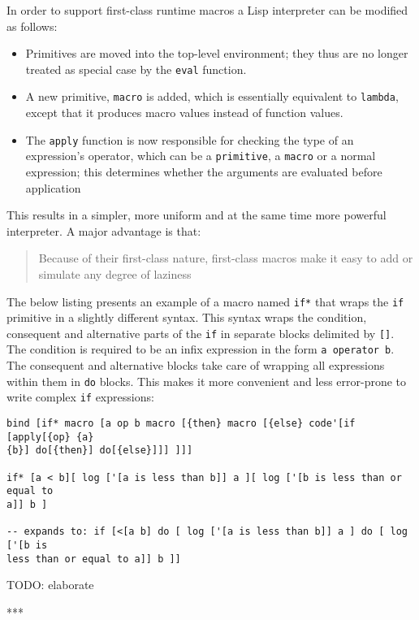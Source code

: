 In order to support first-class runtime macros a Lisp interpreter can be
modified as follows\cite{macros}:
\begin{itemize}
    \item Primitives are moved into the top-level environment; they thus are
    no longer treated as special case by the \texttt{eval} function.
    \item A new primitive, \texttt{macro} is added, which is essentially
    equivalent to \texttt{lambda}, except that it produces macro values
    instead of function values.
    \item The \texttt{apply} function is now responsible for checking the
    type of an expression's operator, which can be a \texttt{primitive}, a
    \texttt{macro} or a normal expression; this determines whether the
    arguments are evaluated before application
\end{itemize}

This results in a simpler, more uniform and at the same time more powerful
interpreter. A major advantage is that:
\begin{quote}
    Because of their first-class nature, first-class macros make it easy to add or
    simulate any degree of laziness\cite{macros}
\end{quote}

The below listing presents an example of a macro named \texttt{if*} that wraps
the \texttt{if} primitive in a slightly different syntax. This syntax wraps the
condition, consequent and alternative parts of the \texttt{if} in separate
blocks delimited by \texttt{[]}. The condition is required to be an infix
expression in the form \texttt{a operator b}. The consequent and alternative
blocks take care of wrapping all expressions within them in \texttt{do}
blocks. This makes it more convenient and less error-prone to write complex
\texttt{if} expressions:
\begin{lstlisting}
bind [if* macro [a op b macro [{then} macro [{else} code'[if [apply[{op} {a}
{b}] do[{then}] do[{else}]]] ]]]

if* [a < b][ log ['[a is less than b]] a ][ log ['[b is less than or equal to
a]] b ]

-- expands to: if [<[a b] do [ log ['[a is less than b]] a ] do [ log ['[b is
less than or equal to a]] b ]]
\end{lstlisting}

TODO: elaborate

***


